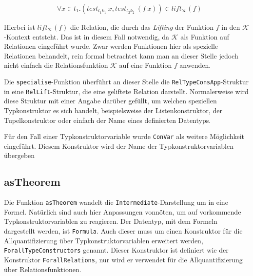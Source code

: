 \begin{align*}
& \forall x \in t_1 . (test_{t_1 k_1}\ x, test_{t_2 k_2}\ (f\ x)) \in lift_{\mathcal{K}}(f)
\end{align*}

Hierbei ist $lift_{\mathcal{K}}(f)$ die Relation, die durch das \textit{Lifting} der Funktion $f$ in den $\mathcal{K}$-Kontext
entsteht. Das ist in diesem Fall notwendig, da $\mathcal{K}$ als Funktion auf Relationen eingeführt wurde. Zwar werden
Funktionen hier als spezielle Relationen behandelt, rein formal betrachtet kann man an dieser Stelle jedoch nicht
einfach die Relationsfunktion $\mathcal{K}$ auf eine Funktion $f$ anwenden.

Die \texttt{specialise}-Funktion überführt an dieser Stelle die \texttt{RelTypeConsApp}-Struktur in eine \texttt{RelLift}-Struktur,
die eine geliftete Relation darstellt. Normalerweise wird diese Struktur mit einer Angabe darüber gefüllt, um welchen speziellen
Typkonstruktor es sich handelt, beispielsweise der Listenkonstruktor, der Tupelkonstruktor oder einfach der Name eines
definierten Datentyps.

Für den Fall einer Typkonstruktorvariable wurde \texttt{ConVar} als weitere Möglichkeit eingeführt. Diesem Konstruktor wird
der Name der Typkonstruktorvariablen übergeben 


\subsection{asTheorem}

Die Funktion \texttt{asTheorem} wandelt die \texttt{Intermediate}-Darstellung um in eine Formel. Natürlich sind auch hier
Anpassungen vonnöten, um auf vorkommende Typkonstruktorvariablen zu reagieren. Der Datentyp, mit dem Formeln
dargestellt werden, ist \texttt{Formula}. Auch dieser muss um einen Konstruktor für die Allquantifizierung über
Typkonstruktorvariablen erweitert werden, \texttt{ForallTypeConstructors} genannt.
Dieser Konstruktor ist definiert wie der Konstruktor \texttt{ForallRelations}, nur wird er verwendet für die Allquantifizierung
über Relationsfunktionen.

